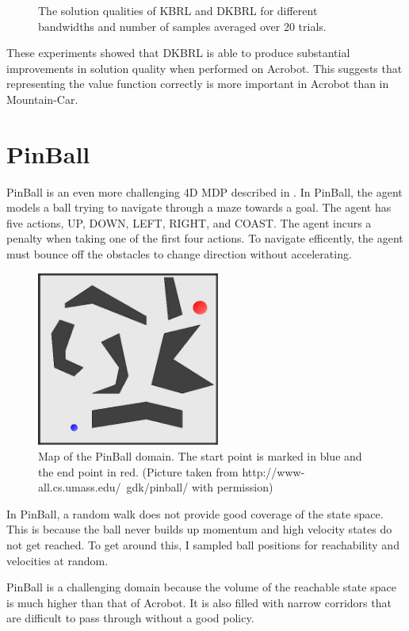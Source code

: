 \begin{figure}[!htb]
  \endminipage
\caption[KBRL vs. DKBRL on Acrobot]
{The solution qualities of KBRL and DKBRL for different bandwidths
and number of samples averaged over 20 trials.}
\end{figure}

These experiments showed that DKBRL is able to produce substantial improvements
in solution quality when performed on Acrobot.
This suggests that representing the value function correctly is more
important in Acrobot than in Mountain-Car.

\section{PinBall}
PinBall is an even more challenging 4D MDP described in \cite{gdk}.
In PinBall, the agent models a ball trying to navigate through a maze towards
a goal.
The agent has five actions, UP, DOWN, LEFT, RIGHT, and COAST.
The agent incurs a penalty when taking one of the first four actions.
To navigate efficently, the agent must bounce off the obstacles to change
direction without accelerating.

\begin{figure}[!!!ht]
  \centering
    \includegraphics[width=60mm]{figs/chap5/pbeasy.jpg}
  \caption[PinBall domain map]{Map of the PinBall domain.
The start point is marked in blue and the end point in red.
(Picture taken from http://www-all.cs.umass.edu/~gdk/pinball/ with permission)}
\end{figure}

In PinBall, a random walk does not provide good coverage of the state space.
This is because the ball never builds up momentum and high velocity states do
not get reached.
To get around this, I sampled ball positions for reachability and velocities
at random.

PinBall is a challenging domain because the volume of the reachable state space
is much higher than that of Acrobot.
It is also filled with narrow corridors that are difficult to pass through
without a good policy.


